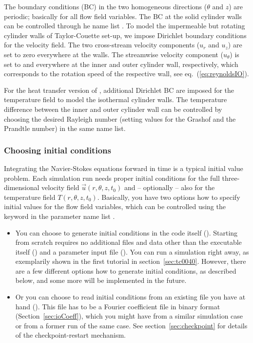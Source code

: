 \documentclass[a4paper, 11pt, DIV=11]{scrartcl}
\begin{document}
The boundary conditions (BC) in the two homogeneous directions ($\theta$ and $z$) are
periodic; basically for all flow field variables. The BC at the solid cylinder walls can be
controlled through he name list . To model the impermeable
but rotating cylinder walls of Taylor-Couette set-up, we impose Dirichlet boundary
conditions for the velocity field. The two cross-stream velocity components ($u_r$ and
$u_z$) are set to zero everywhere at the walls. The streamwise velocity component
($u_{\theta}$) is set to \Rei and \Reo everywhere at the inner and outer cylinder wall,
respectively, which corresponds to the rotation speed of the respective wall, see
eq.~(\ref{eq:reynoldsIO}).
\par
For the heat transfer version of \nsc, additional Dirichlet BC are imposed for the
temperature field to model the isothermal cylinder walls. The temperature difference
between the inner and outer cylinder wall can be controlled by choosing the desired
Rayleigh number (\ie setting values for the Grashof and the Prandtle number) in the
same name list.

\subsubsection{Choosing initial conditions}
\label{sec:initialConditions}

Integrating the Navier-Stokes equations forward in time is a typical initial
value problem. Each simulation run needs proper initial conditions for the
full three-dimensional velocity field $\vec{u}(r,\theta,z,t_0)$ and --
optionally -- also for the temperature field $T(r,\theta,z,t_0)$. Basically,
you have two options how to specify initial values for the flow field
variables, which can be controlled using the keyword  in the
parameter name list .
\begin{itemize}
\item 
You can choose to generate initial conditions in the code itself
(). Starting from scratch requires no additional
files and data other than the executable itself ()
and a parameter input file (). You can run a
simulation right away, as exemplarily shown in the first tutorial
in section~\ref{sec:tc0040}. However, there are a few different
options how to generate initial conditions, as described below, and
some more will be implemented in the future.
\item
Or you can choose to read initial conditions from an existing file
you have at hand (). This file has to be a Fourier
coefficient file in binary format (Section~\ref{sec:ioCoeff}), which
you might have from a similar simulation case or from a former run
of the same case. See section~\ref{sec:checkpoint} for details of
the checkpoint-restart mechanism.
\end{itemize}
\end{document}
